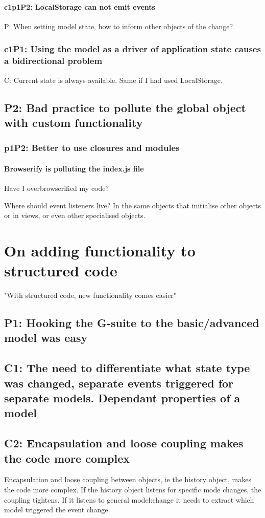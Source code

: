 \documentclass[english]{ifimaster}
\begin{document}
\subsubsection{c1p1P2: LocalStorage can not emit events}
P: When setting model state, how to inform other objects of the change?

\subsection{c1P1: Using the model as a driver of application state causes a bidirectional problem}

C: Current state is always available. Same if I had used LocalStorage.
\section{P2: Bad practice to pollute the global object with custom functionality}
\subsection{p1P2: Better to use closures and modules}
\subsubsection{Browserify is polluting the index.js file}
Have I overbrowserified my code?

Where should event listeners live? In the same objects that initialise other objects or in views, or even other specialised objects.

\chapter{On adding functionality to structured code}
"With structured code, new functionality comes easier"
\section{P1: Hooking the G-suite to the basic/advanced model was easy}
\section{C1: The need to differentiate what state type was changed, separate events triggered for separate models. Dependant properties of a model}
\section{C2: Encapsulation and loose coupling makes the code more complex}
Encapsulation and loose coupling between objects, ie the history object, makes the code more complex. If the history object listens for specific mode changes, the coupling tightens. If it listens to general model:change it needs to extract which model triggered the event change
\end{document}
